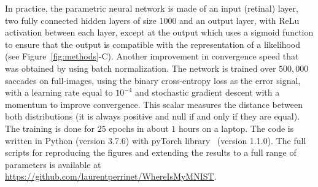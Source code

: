 
In practice, the parametric neural network is made of an input (retinal) layer, two fully connected hidden layers of size 1000
and an output layer, with ReLu activation between each layer, except at the output which uses a sigmoid function to ensure that the output is compatible with the representation of a likelihood (see Figure~\ref{fig:methods}-C).
Another improvement in convergence speed that was obtained by using batch normalization. The network is trained over $500,000$ saccades on full-images, using the binary cross-entropy loss as the error signal, with a learning rate equal to $10^{-4}$ and stochastic gradient descent with a momentum to improve convergence. This scalar measures the distance between both distributions (it is always positive and null if and only if they are equal). The training is done for $25$ epochs in about $1$ hours on a laptop. The code is written in Python (version 3.7.6) with pyTorch library~\citep{Paszke17} (version 1.1.0). The full scripts for reproducing the figures and extending the results to a full range of parameters is available at \url{https://github.com/laurentperrinet/WhereIsMyMNIST}. %
